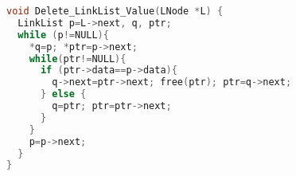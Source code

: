 \begin{lstlisting}[language=C]
void Delete_LinkList_Value(LNode *L) {
  LinkList p=L->next, q, ptr;  
  while (p!=NULL){
    *q=p; *ptr=p->next;
    while(ptr!=NULL){
      if (ptr->data==p->data){
        q->next=ptr->next; free(ptr); ptr=q->next;
      } else {
        q=ptr; ptr=ptr->next;
      }
    }
    p=p->next;
  }
}
\end{lstlisting}
